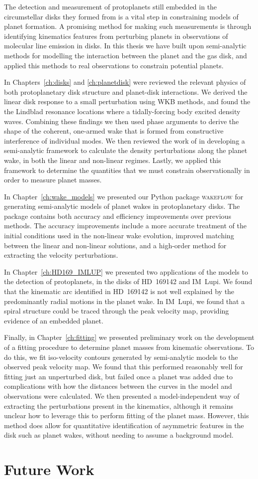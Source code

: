 The detection and measurement of protoplanets still embedded in the circumstellar disks they formed from is a vital step in constraining models of planet formation.
A promising method for making such measurements is through identifying kinematics features from perturbing planets in observations of molecular line emission in disks.
In this thesis we have built upon semi-analytic methods for modelling the interaction between the planet and the gas disk, and applied this methods to real observations to constrain potential planets.

In Chapters~\ref{ch:disks} and \ref{ch:planetdisk} were reviewed the relevant physics of both protoplanetary disk structure and planet-disk interactions.
We derived the linear disk response to a small perturbation using WKB methods, and found the the Lindblad resonance locations where a tidally-forcing body excited density waves.
Combining these findings we then used phase arguments to derive the shape of the coherent, one-armed wake that is formed from constructive interference of individual modes.
We then reviewed the work of \citet{goodman2001,rafikov2002a} in developing a semi-analytic framework to calculate the density perturbations along the planet wake, in both the linear and non-linear regimes.
Lastly, we applied this framework to determine the quantities that we must constrain observationally in order to measure planet masses.

In Chapter~\ref{ch:wake_models} we presented our Python package \textsc{wakeflow} for generating semi-analytic models of planet wakes in protoplanetary disks.
The package contains both accuracy and efficiency improvements over previous methods.
The accuracy improvements include a more accurate treatment of the initial conditions used in the non-linear wake evolution, improved matching between the linear and non-linear solutions, and a high-order method for extracting the velocity perturbations.

In Chapter~\ref{ch:HD169_IMLUP} we presented two applications of the models to the detection of protoplanets, in the disks of HD~169142 and IM~Lupi.
We found that the kinematic arc identified in HD~169142 is not well explained by the predominantly radial motions in the planet wake.
In IM~Lupi, we found that a spiral structure could be traced through the peak velocity map, providing evidence of an embedded planet.

Finally, in Chapter~\ref{ch:fitting} we presented preliminary work on the development of a fitting procedure to determine planet masses from kinematic observations.
To do this, we fit iso-velocity contours generated by semi-analytic models to the observed peak velocity map.
We found that this performed reasonably well for fitting just an unperturbed disk, but failed once a planet was added due to complications with how the distances between the curves in the model and observations were calculated.
We then presented a model-independent way of extracting the perturbations present in the kinematics, although it remains unclear how to leverage this to perform fitting of the planet mass.
However, this method does allow for quantitative identification of asymmetric features in the disk such as planet wakes, without needing to assume a background model.

\section{Future Work}